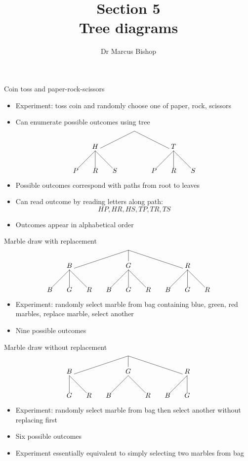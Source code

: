 \documentclass[handout]{beamer}
\title[\S5]{Section 5\\Tree diagrams}
\author{Dr Marcus Bishop}
\theoremstyle{definition}
\begin{document}
\begin{frame}\titlepage\end{frame}
\LogoOff

\begin{frame}{Coin toss and paper-rock-scissors}
\begin{itemize}
\item Experiment: toss coin \alert{and} randomly choose
one of paper, rock, scissors
\item Can enumerate possible outcomes using tree
\[\begin{xy}<1cm,0cm>:
(0,0)="0";
(-2,-1)="-21";
(2,-1)="21";
"0";"-21"*+!D{H}**\dir{-};
"0";"21"*+!D{T}**\dir{-};
"-21";(-3,-2)*{P}**\dir{-};
"-21";(-2,-2)*{R}**\dir{-};
"-21";(-1,-2)*{S}**\dir{-};
"21";(1,-2)*{P}**\dir{-};
"21";(2,-2)*{R}**\dir{-};
"21";(3,-2)*{S}**\dir{-};
\end{xy}\]
\item Possible outcomes correspond with paths from root to leaves
\item Can read outcome by reading letters along path:
\[HP,HR,HS,TP,TR,TS\]
\item Outcomes appear in alphabetical order
\end{itemize}
\end{frame}

\begin{frame}{Marble draw with replacement}
\[\begin{xy}<1cm,0cm>:
(0,0)="0";
(-3,-1)="-31";
(0,-1)="01";
(3,-1)="31";
"0";"-31"*+!D{B}**\dir{-};
"0";"01"*+!D{G}**\dir{-};
"0";"31"*+!D{R}**\dir{-};
"-31";(-4,-2)*{B}**\dir{-};
"-31";(-3,-2)*{G}**\dir{-};
"-31";(-2,-2)*{R}**\dir{-};
"01";(-1,-2)*{B}**\dir{-};
"01";(0,-2)*{G}**\dir{-};
"01";(1,-2)*{R}**\dir{-};
"31";(2,-2)*{B}**\dir{-};
"31";(3,-2)*{G}**\dir{-};
"31";(4,-2)*{R}**\dir{-};
\end{xy}\]
\begin{itemize}
\item Experiment: randomly select marble from bag
containing blue, green, red marbles, replace marble,
select another
\item Nine possible outcomes
\end{itemize}
\end{frame}

\begin{frame}{Marble draw without replacement}
\[\begin{xy}<1cm,0cm>:
(0,0)="0";
(-3,-1)="-31";
(0,-1)="01";
(3,-1)="31";
"0";"-31"*+!D{B}**\dir{-};
"0";"01"*+!D{G}**\dir{-};
"0";"31"*+!D{R}**\dir{-};
"-31";(-3,-2)*{G}**\dir{-};
"-31";(-2,-2)*{R}**\dir{-};
"01";(-1,-2)*{B}**\dir{-};
"01";(1,-2)*{R}**\dir{-};
"31";(2,-2)*{B}**\dir{-};
"31";(3,-2)*{G}**\dir{-};
\end{xy}\]
\begin{itemize}
\item Experiment: randomly select marble from bag
then select another \alert{without replacing} first
\item Six possible outcomes
\item Experiment essentially equivalent to simply
selecting two marbles from bag
\end{itemize}
\end{frame}
\end{document}
